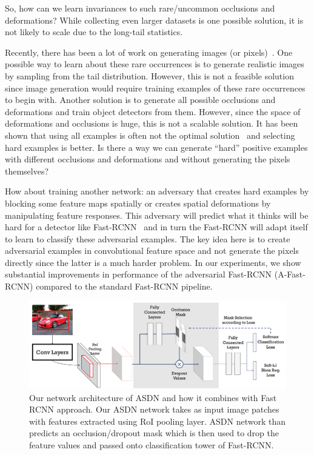 \documentclass[10pt,twocolumn,letterpaper]{article}
\begin{document}
So, how can we learn invariances to such rare/uncommon occlusions and deformations? While collecting even larger datasets is one possible solution, it is not likely to scale due to the long-tail statistics.

Recently, there has been a lot of work on generating images (or pixels)~\cite{goodfellow2014generative,Denton15,Alec15}. One possible way to learn about these rare occurrences is to generate realistic images by sampling from the tail distribution. However, this is not a feasible solution since image generation would require training examples of these rare occurrences to begin with. Another solution is to generate all possible occlusions and deformations and train object detectors from them. However, since the space of deformations and occlusions is huge, this is not a scalable solution. It has been shown that using all examples is often not the optimal solution~\cite{shrivastavaOHEM,minibatchSVM} and selecting hard examples is better. Is there a way we can generate ``hard'' positive examples with different occlusions and deformations and without generating the pixels themselves?


How about training another network: an adversary that creates hard examples by blocking some feature maps spatially or creates spatial deformations by manipulating feature responses. This adversary will predict what it thinks will be hard for a detector like Fast-RCNN~\cite{frcn} and in turn the Fast-RCNN will adapt itself to learn to classify these adversarial examples. The key idea here is to create adversarial examples in convolutional feature space and not generate the pixels directly since the latter is a much harder problem. In our experiments, we show substantial improvements in performance of the adversarial Fast-RCNN (A-Fast-RCNN) compared to the standard Fast-RCNN pipeline.



\begin{figure}
    \centering
    \includegraphics[width=1\textwidth]{network_fp.pdf}
    \caption{Our network architecture of ASDN and how it combines with Fast RCNN approach. Our ASDN network takes as input image patches with features extracted using RoI pooling layer. ASDN network than predicts an occlusion/dropout mask which is then used to drop the feature values and passed onto classification tower of Fast-RCNN.}\label{fig:network}
\end{figure}
\end{document}
